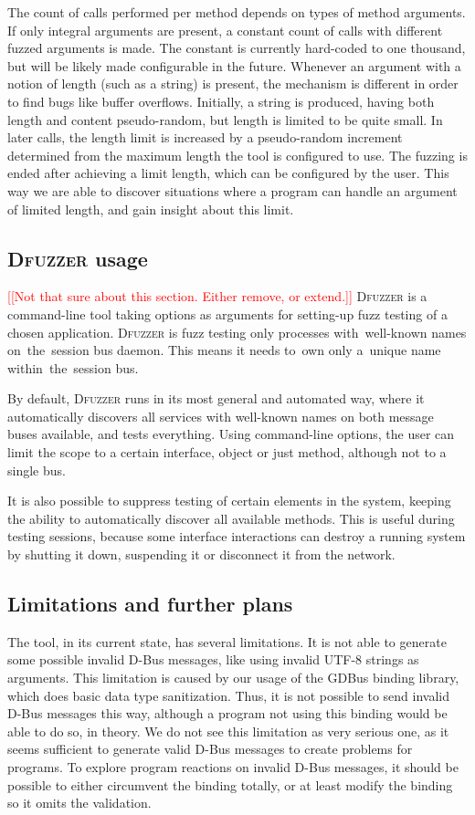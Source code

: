 \documentclass[conference]{IEEEtran}
\newcommand{\addtodo}[1]{\textcolor{red}{[[#1]]}}
\begin{document}
The count of calls performed per method depends on types of method arguments.
If only integral arguments are present, a constant count of calls with
different fuzzed arguments is made. The constant is currently hard-coded to one
thousand, but will be likely made configurable in the future.  Whenever an
argument with a notion of length (such as a string) is present, the mechanism
is different in order to find bugs like buffer overflows. Initially, a string
is produced, having both length and content pseudo-random, but length is
limited to be quite small. In later calls, the length limit is increased by a
pseudo-random increment determined from the maximum length the tool is
configured to use. The fuzzing is ended after achieving a limit length, which
can be configured by the user. This way we are able to discover situations
where a program can handle an argument of limited length, and gain insight
about this limit.


\subsection{\textsc{Dfuzzer} usage}
\addtodo{Not that sure about this section. Either remove, or extend.}
\textsc{Dfuzzer} is a command-line tool taking options as arguments for setting-up fuzz
testing of a chosen application. \textsc{Dfuzzer} is fuzz testing only processes
with~well-known names on~the~session bus daemon. This means it needs to~own
only a~unique name within~the~session bus.


By default, \textsc{Dfuzzer} runs in its most general and automated way, where
it automatically discovers all services with well-known names on both message
buses available, and tests everything. Using command-line options, the user can
limit the scope to a certain interface, object or just method, although not to
a single bus.


It is also possible to suppress testing of certain elements in the system,
keeping the ability to automatically discover all available methods. This is
useful during testing sessions, because some interface interactions can
destroy a running system by shutting it down, suspending it or disconnect it
from the network.

\subsection{Limitations and further plans}
The tool, in its current state, has several limitations. It is not able to generate some possible invalid D-Bus
messages, like using invalid UTF-8 strings as arguments. This limitation is
caused by our usage of the GDBus binding library, which does basic data type
sanitization. Thus, it is not possible to send invalid D-Bus messages this way,
although a program not using this binding would be able to do so, in theory. We
do not see this limitation as very serious one, as it seems sufficient to
generate valid D-Bus messages to create problems for programs. To explore
program reactions on invalid D-Bus messages, it should be possible to either
circumvent the binding totally, or at least modify the binding so it omits the
validation.
\end{document}

